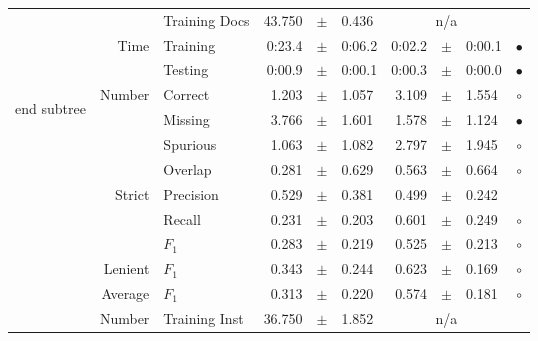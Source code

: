 \begin{longtable}{|r|r|l||rcl|rcl|c|}
\cline{3-10} &                             &   Training Docs &      43.750 &  $\pm$  &       0.436 &    \multicolumn{3}{c|}{n/a}         &  \\
\cline{2-10} & \multirow{2}{*}{      Time} &        Training &      0:23.4 &  $\pm$  &      0:06.2 &      0:02.2 &  $\pm$  &      0:00.1 & $\bullet$ \\
\cline{3-10} &                             &         Testing &      0:00.9 &  $\pm$  &      0:00.1 &      0:00.3 &  $\pm$  &      0:00.0 & $\bullet$ \\
\hline
\hline
\multirow{11}{*}{\begin{sideways}end subtree\end{sideways} }
             & \multirow{4}{*}{    Number} &         Correct &       1.203 &  $\pm$  &       1.057 &       3.109 &  $\pm$  &       1.554 & $\circ$ \\
\cline{3-10} &                             &         Missing &       3.766 &  $\pm$  &       1.601 &       1.578 &  $\pm$  &       1.124 & $\bullet$ \\
\cline{3-10} &                             &        Spurious &       1.063 &  $\pm$  &       1.082 &       2.797 &  $\pm$  &       1.945 & $\circ$ \\
\cline{3-10} &                             &         Overlap &       0.281 &  $\pm$  &       0.629 &       0.563 &  $\pm$  &       0.664 & $\circ$ \\
\cline{2-10} & \multirow{3}{*}{    Strict} &       Precision &       0.529 &  $\pm$  &       0.381 &       0.499 &  $\pm$  &       0.242 &  \\
\cline{3-10} &                             &          Recall &       0.231 &  $\pm$  &       0.203 &       0.601 &  $\pm$  &       0.249 & $\circ$ \\
\cline{3-10} &                             &           $F_1$ &       0.283 &  $\pm$  &       0.219 &       0.525 &  $\pm$  &       0.213 & $\circ$ \\
\cline{2-10} &                     Lenient &           $F_1$ &       0.343 &  $\pm$  &       0.244 &       0.623 &  $\pm$  &       0.169 & $\circ$ \\
\cline{2-10} &                     Average &           $F_1$ &       0.313 &  $\pm$  &       0.220 &       0.574 &  $\pm$  &       0.181 & $\circ$ \\
\cline{2-10} & \multirow{2}{*}{    Number} &   Training Inst &      36.750 &  $\pm$  &       1.852 &    \multicolumn{3}{c|}{n/a}         &  \\

\end{longtable}
